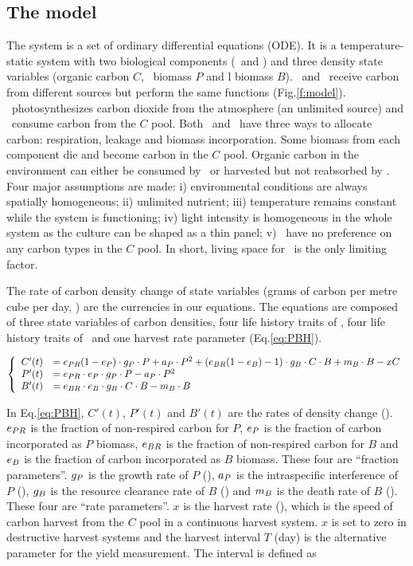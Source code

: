 \documentclass[../thesis.tex]{subfiles} %
\begin{document}
\subsection{The model}
The system is a set of ordinary differential equations (ODE).  It is a temperature-static system with two biological components (\phy\ and \bac) and three density state variables (organic carbon $C$, \phy\ biomass $P$ and \bac l biomass $B$). \Phy\ and \bac\ receive carbon from different sources but perform the same functions (Fig.\ref{f:model}). \Phy\ photosynthesizes carbon dioxide from the atmosphere (an unlimited source) and \bac\ consume carbon from the $C$ pool.  Both \phy\ and \bac\ have three ways to allocate carbon: respiration, leakage and biomass incorporation. Some biomass from each component die and become carbon in the $C$ pool.  Organic carbon in the environment can either be consumed by \bac\ or harvested but not reabsorbed by \phy.  Four major assumptions are made:  \Rn{1}) environmental conditions are always spatially homogeneous; \Rn{2}) unlimited nutrient; \Rn{3}) temperature remains constant while the system is functioning; \Rn{4}) light intensity is homogeneous in the whole system as the culture can be shaped as a thin panel; \Rn{5}) \bac\ have no preference on any carbon types in the $C$ pool.  In short, living space for \phy\ is the only limiting factor.

The rate of carbon density change of state variables (grams of carbon per metre cube per day, \dxdt) are the currencies in our equations.  The equations are composed of three state variables of carbon densities, four life history traits of \phy, four life history traits of \bac\ and one harvest rate parameter (Eq.\ref{eq:PBH}).

\begin{equation}\left\{\begin{array}{rl}
    C'(t) &= e_{PR}(1-e_P)\cdot g_P\cdot P +a_P\cdot P^2 +(e_{BR}(1-e_B)-1)\cdot g_B\cdot C\cdot B +m_B\cdot B -xC\\
    P'(t) &= e_{PR}\cdot e_P\cdot g_P\cdot P -a_P\cdot P^2\\
    B'(t) &= e_{BR}\cdot e_B\cdot g_B\cdot C\cdot B -m_B\cdot B
\end{array}\right.\label{eq:PBH}\end{equation}

In Eq.\ref{eq:PBH}, $C'(t)$, $P'(t)$ and $B'(t)$ are the rates of density change (\dxdt).  $e_{PR}$ is the fraction of non-respired carbon for $P$, $e_P$ is the fraction of carbon incorporated as $P$ biomass, $e_{BR}$ is the fraction of non-respired carbon for $B$ and $e_B$ is the fraction of carbon incorporated as $B$ biomass.  These four are ``fraction parameters”.  $g_P$ is the growth rate of $P$ (\dayU), $a_P$ is the intraspecific interference of $P$ (\denI), $g_B$ is the resource clearance rate of $B$  (\denI) and $m_B$ is the death rate of $B$ (\dayU).  These four are ``rate parameters”.  $x$ is the harvest rate (\dayU), which is the speed of carbon harvest from the $C$ pool in a continuous harvest system.  $x$ is set to zero in destructive harvest systems and the harvest interval $T$ (day) is the alternative parameter for the yield measurement.  The interval is defined as
\end{document}

